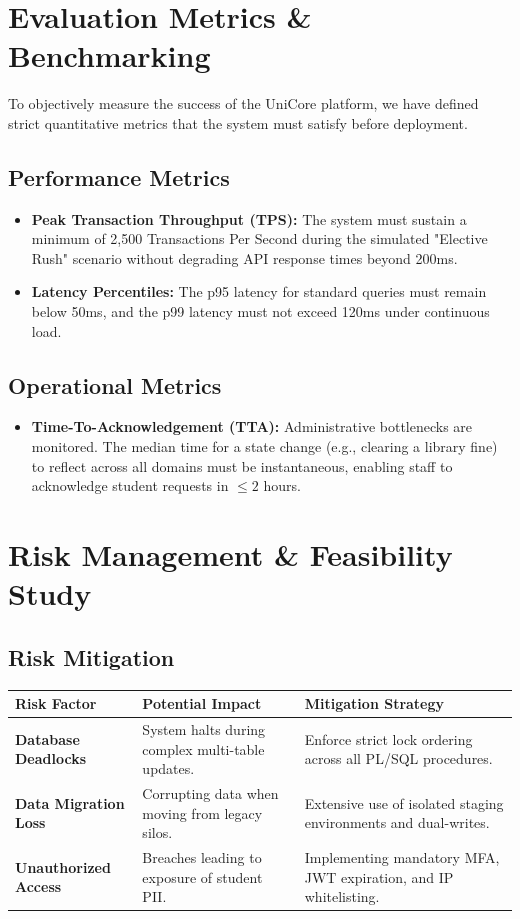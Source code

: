 \documentclass[11pt,a4paper]{article}
\begin{document}
\section{Evaluation Metrics \& Benchmarking}

To objectively measure the success of the UniCore platform, we have defined strict quantitative metrics that the system must satisfy before deployment.

\subsection{Performance Metrics}
\begin{itemize}
    \item \textbf{Peak Transaction Throughput (TPS):} The system must sustain a minimum of 2,500 Transactions Per Second during the simulated "Elective Rush" scenario without degrading API response times beyond 200ms.
    \item \textbf{Latency Percentiles:} The p95 latency for standard queries must remain below 50ms, and the p99 latency must not exceed 120ms under continuous load.
\end{itemize}

\subsection{Operational Metrics}
\begin{itemize}
    \item \textbf{Time-To-Acknowledgement (TTA):} Administrative bottlenecks are monitored. The median time for a state change (e.g., clearing a library fine) to reflect across all domains must be instantaneous, enabling staff to acknowledge student requests in $\le 2$ hours.
\end{itemize}


\section{Risk Management \& Feasibility Study}

\subsection{Risk Mitigation}
\begin{tabularx}{\textwidth}{l X X}
\toprule
\textbf{Risk Factor} & \textbf{Potential Impact} & \textbf{Mitigation Strategy} \\
\midrule
\textbf{Database Deadlocks} & System halts during complex multi-table updates. & Enforce strict lock ordering across all PL/SQL procedures. \\
\textbf{Data Migration Loss} & Corrupting data when moving from legacy silos. & Extensive use of isolated staging environments and dual-writes. \\
\textbf{Unauthorized Access} & Breaches leading to exposure of student PII. & Implementing mandatory MFA, JWT expiration, and IP whitelisting. \\
\bottomrule
\end{tabularx}
\end{document}
